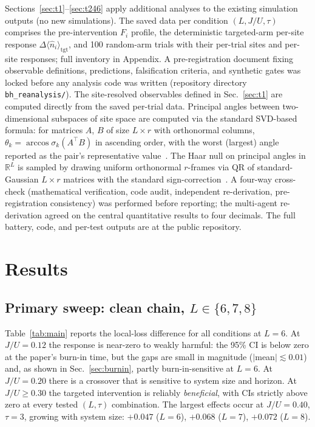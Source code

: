 \documentclass[aps,prresearch,reprint,amsmath,amssymb,longbibliography,floatfix]{revtex4-2}
\newcommand{\Fi}{F_i}
\newcommand{\nop}{\hat{n}}
\begin{document}
Sections~\ref{sec:t1}--\ref{sec:t246} apply additional analyses to the
existing simulation outputs (no new simulations).
The saved data per condition $(L, J/U, \tau)$ comprises the
pre-intervention $\Fi$ profile, the deterministic targeted-arm per-site
response $\Delta\langle\nop_i\rangle_{\mathrm{tgt}}$, and 100 random-arm
trials with their per-trial sites and per-site responses; full inventory
in Appendix.
A pre-registration document
fixing observable definitions, predictions, falsification criteria, and
synthetic gates was locked before any analysis code was written
(repository directory \texttt{bh\_reanalysis/}).
The site-resolved observables defined in Sec.~\ref{sec:t1} are computed
directly from the saved per-trial data.
Principal angles between two-dimensional subspaces of site space are
computed via the standard SVD-based formula: for matrices $A$, $B$ of
size $L\times r$ with orthonormal columns,
$\theta_k = \arccos\sigma_k(A^\top B)$ in ascending order, with the
worst (largest) angle reported as the pair's representative
value~\cite{golub2013}.
The Haar null on principal angles in $\mathbb{R}^L$ is sampled by drawing
uniform orthonormal $r$-frames via QR of standard-Gaussian $L\times r$
matrices with the standard sign-correction~\cite{mezzadri2007}.
A four-way cross-check (mathematical verification, code audit,
independent re-derivation, pre-registration consistency) was performed
before reporting; the multi-agent re-derivation agreed on the central
quantitative results to four decimals.
The full battery, code, and per-test outputs are at the public
repository.

\section{Results}
\label{sec:results}

\subsection{Primary sweep: clean chain, $L\in\{6,7,8\}$}
\label{sec:primary}

Table~\ref{tab:main} reports the local-loss difference for all conditions
at $L=6$.
At $J/U=0.12$ the response is near-zero to weakly harmful: the 95\% CI is
below zero at the paper's burn-in time, but the gaps are small in magnitude
($|$mean$|\lesssim0.01$) and, as shown in Sec.~\ref{sec:burnin}, partly
burn-in-sensitive at $L=6$.
At $J/U=0.20$ there is a crossover that is sensitive to system size and
horizon.
At $J/U\geq0.30$ the targeted intervention is reliably \emph{beneficial},
with CIs strictly above zero at every tested $(L,\tau)$ combination.
The largest effects occur at $J/U=0.40$, $\tau=3$, growing with system
size: $+0.047$ ($L=6$), $+0.068$ ($L=7$), $+0.072$ ($L=8$).
\end{document}
